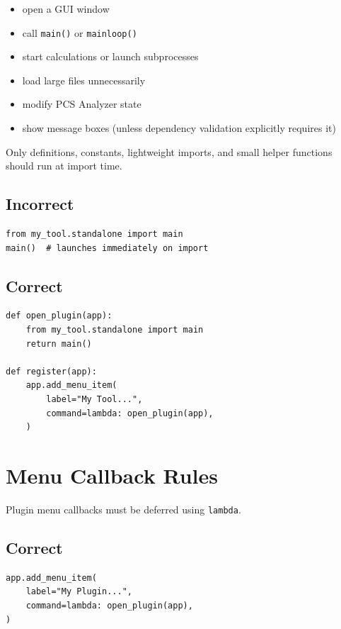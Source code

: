 \documentclass[11pt, a4paper]{article}
\begin{document}
\begin{itemize}
  \item open a GUI window
  \item call \texttt{main()} or \texttt{mainloop()}
  \item start calculations or launch subprocesses
  \item load large files unnecessarily
  \item modify PCS Analyzer state
  \item show message boxes (unless dependency validation explicitly requires it)
\end{itemize}

Only definitions, constants, lightweight imports, and small helper functions should run at import time.

\subsection*{Incorrect}
\begin{lstlisting}[style=python]
from my_tool.standalone import main
main()  # launches immediately on import
\end{lstlisting}

\subsection*{Correct}
\begin{lstlisting}[style=python]
def open_plugin(app):
    from my_tool.standalone import main
    return main()

def register(app):
    app.add_menu_item(
        label="My Tool...",
        command=lambda: open_plugin(app),
    )
\end{lstlisting}

\section{Menu Callback Rules}

Plugin menu callbacks must be deferred using \texttt{lambda}.

\subsection*{Correct}
\begin{lstlisting}[style=python]
app.add_menu_item(
    label="My Plugin...",
    command=lambda: open_plugin(app),
)
\end{lstlisting}
\end{document}
